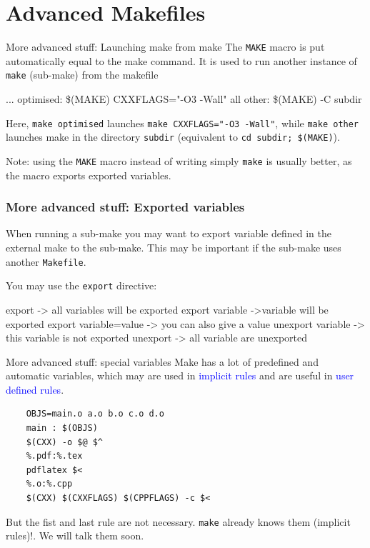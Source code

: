\documentclass[10pt,aspectratio=169]{beamer}
\newcommand{\blue}{\color{blue}}
\begin{document}
\section*{Advanced Makefiles}
\begin{frame}{More advanced stuff: Launching make from make}
The \texttt{MAKE} macro is put automatically equal to the make command. It is used to run
another instance of \texttt{make} (sub-make) from the makefile
\vspace*{-.3cm}
\begin{semiverbatim}
...\newline
optimised:\newline
\phantom{xx} \$(MAKE) CXXFLAGS="-O3 -Wall" all\newline
other:\newline
\phantom{xx} \$(MAKE) -C subdir
\end{semiverbatim}

Here, \texttt{make optimised} launches \texttt{make CXXFLAGS="-O3
  -Wall"}, while \texttt{make other} launches make in the directory \texttt{subdir} (equivalent to \texttt{cd subdir; \$(MAKE)}).

Note: using the \texttt{MAKE} macro instead of writing simply
\texttt{make} is usually better, as the macro exports exported variables.
\end{frame}

\begin{frame}[fragile]
  \frametitle{More advanced stuff: Exported variables}

  When running a sub-make you may want to export variable defined in the
  external make to the sub-make. This may be important if the
  sub-make uses another \texttt{Makefile}.

You may use the  \texttt{export} directive:
\begin{semiverbatim}
export  -> all variables will be exported
export variable ->variable will be exported
export variable=value -> you can also give a value
unexport variable -> this variable is not exported
unexport -> all variable are unexported
\end{semiverbatim}

\end{frame}


\begin{frame}[fragile]{More advanced stuff: special variables}
    Make has a lot of \alert{predefined} and \alert{automatic variables}, which may are used
    in \textcolor{blue}{implicit rules} and are useful in
    \textcolor{blue}{user defined rules}. 
    \begin{verbatim}
    OBJS=main.o a.o b.o c.o d.o
    main : $(OBJS)
    $(CXX) -o $@ $^
    %.pdf:%.tex
    pdflatex $<
    %.o:%.cpp
    $(CXX) $(CXXFLAGS) $(CPPFLAGS) -c $<
    \end{verbatim}
    
    But the fist and last rule are {\blue not necessary}. \texttt{make} already knows them (\alert{implicit rules})!. We will talk them soon.
\end{frame}
\end{document}
